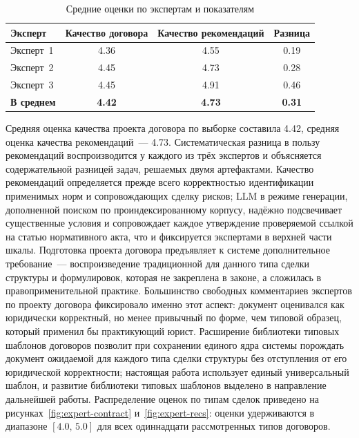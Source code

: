 \begin{table}[H]
\caption{Средние оценки по экспертам и показателям}
\label{tab:expert-means}
\renewcommand{\arraystretch}{1.20}
\begin{tabularx}{\textwidth}{|>{\raggedright\arraybackslash}X|c|c|c|} \hline
\textbf{Эксперт} & \textbf{Качество договора} & \textbf{Качество рекомендаций} & \textbf{Разница} \\ \hline
Эксперт~1 & 4.36 & 4.55 & 0.19 \\ \hline
Эксперт~2 & 4.45 & 4.73 & 0.28 \\ \hline
Эксперт~3 & 4.45 & 4.91 & 0.46 \\ \hline
\textbf{В среднем} & \textbf{4.42} & \textbf{4.73} & \textbf{0.31} \\ \hline
\end{tabularx}
\end{table}

Средняя оценка качества проекта договора по выборке составила 4.42, средняя оценка качества рекомендаций~--- 4.73. Систематическая разница в пользу рекомендаций воспроизводится у каждого из трёх экспертов и объясняется содержательной разницей задач, решаемых двумя артефактами. Качество рекомендаций определяется прежде всего корректностью идентификации применимых норм и сопровождающих сделку рисков; LLM в режиме генерации, дополненной поиском по проиндексированному корпусу, надёжно подсвечивает существенные условия и сопровождает каждое утверждение проверяемой ссылкой на статью нормативного акта, что и фиксируется экспертами в верхней части шкалы. Подготовка проекта договора предъявляет к системе дополнительное требование~--- воспроизведение традиционной для данного типа сделки структуры и формулировок, которая не закреплена в законе, а сложилась в правоприменительной практике. Большинство свободных комментариев экспертов по проекту договора фиксировало именно этот аспект: документ оценивался как юридически корректный, но менее привычный по форме, чем типовой образец, который применил бы практикующий юрист. Расширение библиотеки типовых шаблонов договоров позволит при сохранении единого ядра системы порождать документ ожидаемой для каждого типа сделки структуры без отступления от его юридической корректности; настоящая работа использует единый универсальный шаблон, и развитие библиотеки типовых шаблонов выделено в направление дальнейшей работы. Распределение оценок по типам сделок приведено на рисунках~\ref{fig:expert-contract} и~\ref{fig:expert-recs}: оценки удерживаются в диапазоне $[4.0,\,5.0]$ для всех одиннадцати рассмотренных типов договоров.

